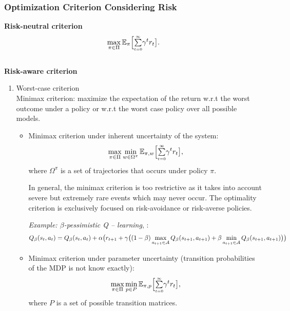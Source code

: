 \subsubsection{Optimization Criterion Considering Risk}

\textbf{Risk-neutral criterion}
\begin{align}
\max_{\pi \in \Pi} \mathbb{E}_\pi\Big[{\textstyle \sum\limits_{\scriptscriptstyle t=0}^{\scriptscriptstyle \infty}}\gamma^t r_t\big].
\end{align}
\\
\textbf{Risk-aware criterion}
\begin{enumerate}
\item
	Worst-case criterion\\
	Minimax criterion: maximize the expectation of the return w.r.t the worst outcome under a policy or w.r.t the worst case policy over all possible models.
	\begin{itemize}
	\item
		Minimax criterion under inherent uncertainty of the system:
		\begin{align}
			\max_{\pi \in \Pi} \min_{w \in \Omega^{\pi}} \mathbb{E}_{\pi, w}\Big[{\textstyle \sum\limits_{\scriptscriptstyle t=0}^{\scriptscriptstyle \infty}}\gamma^t r_t\big],
		\end{align}
		where $\Omega^{\pi}$ is a set of trajectories that occurs under policy $\pi$.
	
		In general, the minimax criterion is too restrictive as it takes into account severe but extremely rare events which may never occur. The optimality criterion is exclusively focused on risk-avoidance or risk-averse policies.
		
		\emph{Example: $\beta$-pessimistic Q -- learning}, \citep{Gaskett_2003}:
		\begin{align}
		Q_{\beta}(s_t, a_t) = Q_{\beta}(s_t, a_t) + \alpha \big( r_{t+1} + \gamma \big( (1-\beta) \max_{a_{t+1} \in \mathcal{A}} Q_{\beta}(s_{t+1}, a_{t+1}) + \beta \min_{a_{t+1} \in \mathcal{A}} Q_{\beta}(s_{t+1}, a_{t+1}) \big) \big)
		\end{align}
		
	\item
		Minimax criterion under parameter uncertainty (transition probabilities of the MDP is not know exactly):
		\begin{align}
			\max_{\pi \in \Pi} \min_{p \in P} \mathbb{E}_{\pi, p}\Big[{\textstyle \sum\limits_{\scriptscriptstyle t=0}^{\scriptscriptstyle \infty}}\gamma^t r_t\big],
		\end{align}
		where $P$ is a set of possible transition matrices.
	\end{itemize}
	

\end{enumerate}
